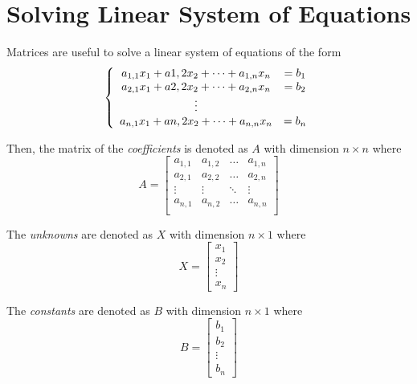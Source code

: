 \section{Solving Linear System of Equations}

\begin{definition}
    Matrices are useful to solve a linear system of equations of the form
    \begin{equation}
        \left\{
        \begin{array}{c c}
            a_{1, 1} x_1 + a{1, 2} x_2 + \cdots + a_{1, n} x_n &= b_1 \\
            a_{2, 1} x_1 + a{2, 2} x_2 + \cdots + a_{2, n} x_n &= b_2 \\
            \vdots &\phantom{}  \\
            a_{n, 1} x_1 + a{n, 2} x_2 + \cdots + a_{n, n} x_n &= b_n \\
        \end{array}
        \right.
    \end{equation}
    
    Then, the matrix of the \textit{coefficients} is denoted as $A$ with dimension $n \times n$ where
    \begin{equation}
        A = \begin{bmatrix}
            a_{1, 1} & a_{1, 2} & \dots  & a_{1, n} \\
            a_{2, 1} & a_{2, 2} & \dots  & a_{2, n} \\
            \vdots   & \vdots   & \ddots & \vdots   \\
            a_{n, 1} & a_{n, 2} & \dots & a_{n, n} \\
        \end{bmatrix}
    \end{equation}
    
    The \textit{unknowns} are denoted as $X$ with dimension $n \times 1$ where
    \begin{equation}
        X = \begin{bmatrix}
            x_1 \\
            x_2 \\
            \vdots \\
            x_n
        \end{bmatrix}
    \end{equation}
    
    The \textit{constants} are denoted as $B$ with dimension $n \times 1$ where
    \begin{equation}
        B = \begin{bmatrix}
            b_1 \\
            b_2 \\
            \vdots \\
            b_n
        \end{bmatrix}
    \end{equation}
    

\end{definition}
